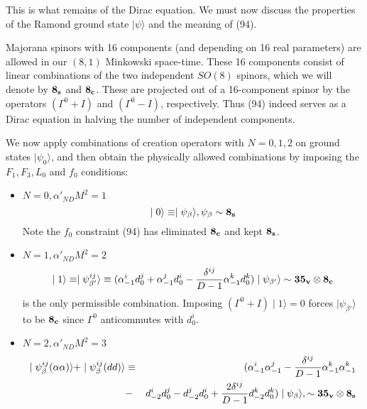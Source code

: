 \documentclass[a4paper,a4paper]{article}
\begin{document}
This is what remains of the Dirac equation.  We must now discuss
the properties of the Ramond ground state $\mid\psi\rangle$ and
the meaning of (94).

Majorana spinors with 16 components (and depending on 16 real
parameters) are allowed in our $(8,1)$ Minkowski space-time.
These 16 components consist of linear combinations of the two
independent $SO(8)$ spinors, which we will denote by ${\bf 8_{s}}$
and ${\bf 8_{c}}$.  These are projected out of a 16-component
spinor by the operators $(\Gamma^0 + I)$ and $(\Gamma^0 - I)$,
respectively.  Thus (94) indeed serves as a Dirac equation in
halving the number of independent components.

We now apply combinations of creation operators with $N=0,1,2$ on
ground states $\mid\psi_0\rangle$, and then obtain the physically
allowed combinations by imposing the $F_{1}, F_{3},  L_0$ and $f_0$
conditions:


\begin{itemize}
\item $N=0, \alpha'_{ND}M^{2}=1$
\[
\mid0\rangle \equiv \mid\psi_{\beta}\rangle, \psi_{\beta} \sim
{\bf 8_{s}}
\]
Note the $f_0$ constraint (94) has eliminated ${\bf 8_{c}}$ and kept
${\bf 8_{s}}$.
\item $N=1, \alpha'_{ND}M^{2}=2$
\[
\mid1\rangle \equiv \mid\psi^{ij}_{\beta'}\rangle \equiv
(\alpha_{-1}^{i}d_{0}^{j}+\alpha_{-1}^{j}d_{0}^{i}-
\frac{\delta^{ij}}{D-1}\alpha_{-1}^{k}d_{0}^{k})
\mid\psi_{\beta'}\rangle \sim {\bf 35_{v}\otimes \bf 8_{c}}
\]
is the only permissible combination.
Imposing $(\Gamma^0 + I)\mid1\rangle = 0$
forces $\mid\psi_{\beta'}\rangle$ to be ${\bf 8_{c}}$  since $\Gamma^0$
anticommutes with $d^{i}_{0}$.
\item $N=2,\alpha'_{ND}M^{2}=3$
\begin{eqnarray*}
\mid\psi^{ij}_{\beta}(\alpha \alpha)\rangle
+\mid\psi^{ij}_{\beta}(dd)\rangle &\equiv&
(\alpha_{-1}^{i}\alpha_{-1}^{j}-\frac{\delta^{ij}}
{D-1}\alpha_{-1}^{k}\alpha_{-1}^{k}\\&-&d_{-2}^{i}d_{0}^{j}-
d_{-2}^{j}d_{0}^{i}+\frac{2\delta^{ij}}{D-1}d_{-2}^{k}d_{0}^{k})
\mid\psi_{\beta}\rangle,\sim {\bf 35_{v}\otimes\bf 8_{s}}
\end{eqnarray*}
\end{itemize}
\end{document}
